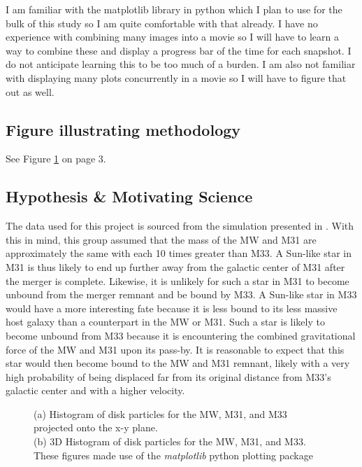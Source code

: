 \documentclass{aastex63}
\begin{document}
I am familiar with the matplotlib library in python which I plan to use for the bulk of this study so I am quite comfortable with that already. I have no experience with combining many images into a movie so I will have to learn a way to combine these and display a progress bar of the time for each snapshot. I do not anticipate learning this to be too much of a burden. I am also not familiar with displaying many plots concurrently in a movie so I will have to figure that out as well.
\subsection{Figure illustrating methodology}
See Figure \ref{fig:Figure 2} on page 3. \\
\subsection{Hypothesis \& Motivating Science}
The data used for this project is sourced from the simulation presented in \cite{2012ApJ...753....9V}. With this in mind, this group assumed that the mass of the MW and M31 are approximately the same with each 10 times greater than M33. A Sun-like star in M31 is thus likely to end up further away from the galactic center of M31 after the merger is complete. Likewise, it is unlikely for such a star in M31 to become unbound from the merger remnant and be bound by M33. A Sun-like star in M33 would have a more interesting fate because it is less bound to its less massive host galaxy than a counterpart in the MW or M31. Such a star is likely to become unbound from M33 because it is encountering the combined gravitational force of the MW and M31 upon its pass-by. It is reasonable to expect that this star would then become bound to the MW and M31 remnant, likely with a very high probability of being displaced far from its original distance from M33's galactic center and with a higher velocity.

\begin{figure}
    \caption{(a) Histogram of disk particles for the MW, M31, and M33 projected onto the x-y plane.\\ (b) 3D Histogram of disk particles for the MW, M31, and M33. These figures made use of the \textit{matplotlib} python plotting package \citep{Hunter:2007}}
    \label{fig:Figure 2}
\end{figure}

{}

\end{document}
